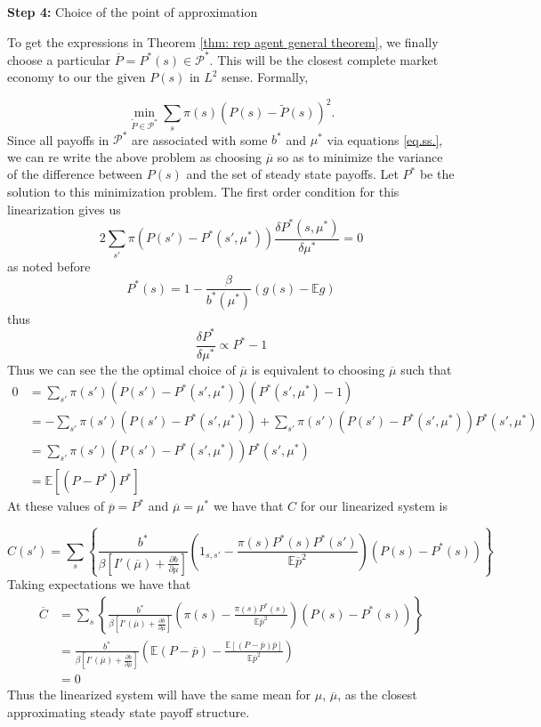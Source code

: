 \documentclass[thmsb,11pt]{article}
\newcommand{\EE}{\mathbb E}
\newcommand{\barC}{{\overline C}}
\newcommand{\pbar}{{\overline p}}
\newcommand{\mubar}{{\overline \mu}}
\begin{document}
\textbf{Step 4:} Choice of the point of approximation

To get the expressions in Theorem \ref{thm: rep agent general theorem}, we finally choose a particular $\overline{P}=P^*(s) \in \mathcal{P}^*$. This will be the closest complete market economy to our the given $P(s)$ in $L^2$ sense. Formally,

\[
\min_{\tilde{P}\in \mathcal{P}^*} \sum_{s}\pi(s)( P(s)-\tilde{P}(s))^2.
\]
Since all payoffs in $\mathcal{P}^*$ are associated with some $b^*$ and $\mu^*$ via equations \eqref{eq.ss.},  we can re write the above problem as choosing $\mubar$ so as to minimize the variance of the difference between $ P(s)$ and the set of steady state payoffs.  Let $P^*$ be the solution to this minimization problem. The first order condition for this linearization gives us
\[
	2\sum_{s'}\pi( P(s')-P^*(s',\mu^*)) \frac{\delta P^*(s,\mu^*)}{\delta \mu^*} = 0
\]as noted before
\[
	P^*(s) =  1 -\frac{\beta}{b^*(\mu^*)}\left(g(s) - \EE g\right)
\]thus
\[
\frac{\delta P^*}{\delta \mu^*}\propto P^*-1
\]Thus we can see the the optimal choice of $\mubar$ is equivalent to choosing $\mubar$ such that
\begin{equation}
	\begin{split}
		0 &= \sum_{s'}\pi(s')( P(s') - P^*(s',\mu^*))(P^*(s',\mu^*)-1)\\
		&= -\sum_{s'}\pi(s')( P(s')-P^*(s',\mu^*)) + \sum_{s'}\pi(s')( P(s')-P^*(s',\mu^*))P^*(s',\mu^*)\\
		&= \sum_{s'}\pi(s')( P(s')-P^*(s',\mu^*))P^*(s',\mu^*)\\
		&=\EE\left[( P-P^*)P^*\right]
	\end{split}
\end{equation}  At these values of $\pbar=P^*$ and $\mubar=\mu^*$ we have that $C$ for our linearized system is

\[
	C(s') = \sum_s\left\{\frac{{b^{*}}}{\beta\left[I'(\mubar)+\frac{\partial b}{\partial\mu}\right]}\left(1_{s,s'}-\frac{\pi(s) P^*(s)P^*(s')}{\EE\pbar^2}\right)(P(s)-P^*(s)) \right\}
\]Taking expectations we have that
\begin{equation}
\begin{split}
	\barC &= \sum_s\left\{\frac{{b^{*}}}{\beta\left[I'(\mubar)+\frac{\partial b}{\partial\mu}\right]}\left(\pi(s) - \frac{\pi(s)P^*(s)}{\EE\pbar^2}\right)( P(s)-P^*(s))\right\}\\
	&=\frac{{b^{*}}}{\beta\left[I'(\mubar)+\frac{\partial b}{\partial\mu}\right]}\left(\EE( P-\pbar) -\frac{\EE\left[( P-\pbar)\pbar\right]}{\EE\pbar^2}\right)\\
	&= 0
\end{split}
\end{equation}  Thus the linearized system will have the same mean for $\mu$, $\mubar$, as the closest approximating steady state payoff structure.
\end{document}
